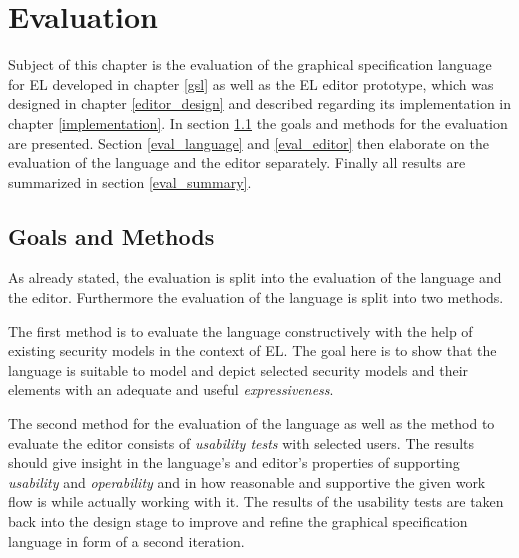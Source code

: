 \documentclass[twoside, openright, 12pt]{book}
\begin{document}



\cleardoublepage
\chapter{Evaluation}
\label{evaluation}
Subject of this chapter is the evaluation of the graphical specification language for EL developed in chapter \ref{gsl} as well as the EL editor prototype, which was designed in chapter \ref{editor_design} and described regarding its implementation in chapter \ref{implementation}.
In section \ref{eval_goals} the goals and methods for the evaluation are presented.
Section \ref{eval_language} and \ref{eval_editor} then elaborate on the evaluation of the language and the editor separately.
Finally all results are summarized in section \ref{eval_summary}.



\section{Goals and Methods}
\label{eval_goals}
As already stated, the evaluation is split into the evaluation of the language and the editor.
Furthermore the evaluation of the language is split into two methods.

The first method is to evaluate the language constructively with the help of existing security models in the context of EL.
The goal here is to show that the language is suitable to model and depict selected security models and their elements with an adequate and useful \textit{expressiveness}.

The second method for the evaluation of the language as well as the method to evaluate the editor consists of \textit{usability tests} with selected users.
The results should give insight in the language's and editor's properties of supporting \textit{usability} and \textit{operability} and in how reasonable and supportive the given work flow is while actually working with it.
The results of the usability tests are taken back into the design stage to improve and refine the graphical specification language in form of a second iteration.
\end{document}
